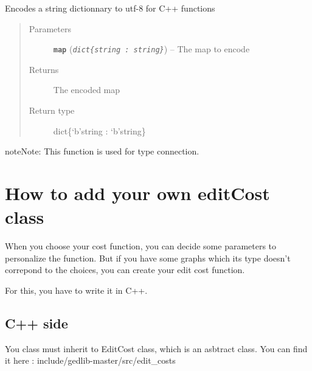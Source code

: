 \documentclass[letterpaper,10pt,english]{sphinxmanual}
\begin{document}

\begin{fulllineitems}
\label{doc:PythonGedLib.encodeYourMap}
Encodes a string dictionnary to utf-8 for C++ functions
\begin{quote}\begin{description}
\item[{Parameters}] \leavevmode
\textbf{\texttt{map}} (\emph{\texttt{dict\{string : string\}}}) -- The map to encode

\item[{Returns}] \leavevmode
The encoded map

\item[{Return type}] \leavevmode
dict\{`b'string : `b'string\}

\end{description}\end{quote}

\begin{notice}{note}{Note:}
This function is used for type connection.
\end{notice}

\end{fulllineitems}



\chapter{How to add your own editCost class}
\label{editcost:how-to-add-your-own-editcost-class}\label{editcost::doc}
When you choose your cost function, you can decide some parameters to personalize the function. But if you have some graphs which its type doesn't correpond to the choices, you can create your edit cost function.

For this, you have to write it in C++.


\section{C++ side}
\label{editcost:c-side}
You class must inherit to EditCost class, which is an asbtract class. You can find it here : include/gedlib-master/src/edit\_costs
\end{document}
